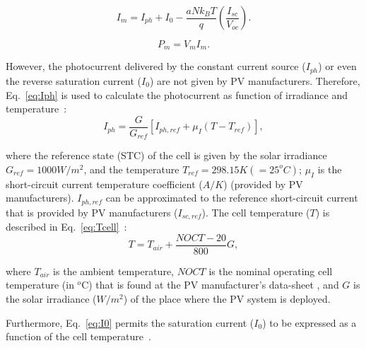 \documentclass[journal]{IEEEtran}
\begin{document}
\begin{equation}
\label{eq:Imfinal}
I_{m} = I_{ph} + I_{0} - \dfrac{aNk_{B}T}{q} \left( \dfrac{I_{sc}}{V_{oc}} \right).  
\end{equation}

\begin{equation}
\label{eq:Pm}
P_{m} = V_{m} I_{m}.
\end{equation}

%
However, the photocurrent delivered by the constant current source ($I_{ph}$) or even the reverse saturation current ($ I_{0} $) are not given by PV manufacturers. Therefore, Eq.~\eqref{eq:Iph} is used to calculate the photocurrent as function of irradiance and temperature~\cite{Villalva}:
\begin{equation}
\label{eq:Iph}
I_{ph}=\dfrac{G}{G_{ref}} \left[ I_{ph,ref} + \mu_{I} \left( T-T_{ref} \right)    \right], 
\end{equation}

\noindent where the reference state (STC) of the cell is given by the solar irradiance $ G_{ref}=1000 W/m^{2} $, and the temperature $ T_{ref}=298.15 K (=25^{o}C) $; $ \mu_{I} $ is the short-circuit current temperature coefficient ($A/K$) %
(provided by PV manufacturers). $ I_{ph,ref} $ can be approximated to the reference short-circuit current \cite{Jakhrani} that is provided by PV manufacturers ($ I_{sc,ref} $).
%
The cell temperature ($ T $) is described in Eq.~\ref{eq:Tcell}~\cite{Ross}:
\begin{equation}
\label{eq:Tcell}
T = T_{air} + \dfrac{NOCT-20}{800}G,
\end{equation}

\noindent where $ T_{air} $ is the ambient temperature, $NOCT$ is the nominal operating cell temperature (in $^{o}$C) that is found at the PV manufacturer's data-sheet \cite{Ross}, and $G$ is the solar irradiance ($ W/m^{2} $) of the place where the PV system is deployed.

Furthermore, Eq.~\eqref{eq:I0} permits the saturation current ($ I_{0} $) to be expressed as a function of the cell temperature~\cite{Villalva}. 
\end{document}
